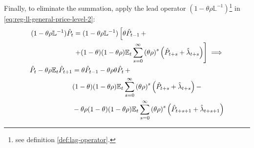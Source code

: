 \documentclass[
	thesis.tex
	]{subfiles}
\begin{document}
Finally, to eliminate the summation, apply the lead operator $(1- \theta \rho \mathbb{L}^{-1})$\footnote{see definition \ref{def:lag-operator}.} in \ref{eq:reg-ll-general-price-level-2}:
\begin{align}
	\begin{split}
		(1- \theta \rho \mathbb{L}^{-1}) \hat{P}_t &= (1- \theta \rho \mathbb{L}^{-1}) \left[ \theta \hat{P}_{t-1} \, + \right. \\
		&\left. + (1-\theta) (1- \theta \rho) {\mathbb{E}_{t}} \sum_{s=0}^{\infty} \left( \theta \rho \right)^s \left( \hat{P}_{t+s} + \hat{\lambda}_{t+s} \right) \right] \implies \nonumber
	\end{split} \\
	\begin{split}
		\hat{P}_t - \theta \rho {\mathbb{E}_{t}} \hat{P}_{t+1} &= \theta \hat{P}_{t-1} - \theta \rho \theta \hat{P}_t \, + \\
		& (1-\theta) (1- \theta \rho) {\mathbb{E}_{t}} \sum_{s=0}^{\infty} \left( \theta \rho \right)^s \left( \hat{P}_{t+s} + \hat{\lambda}_{t+s} \right) - \\
		& - \theta \rho (1-\theta) (1- \theta \rho) {\mathbb{E}_{t}} \sum_{s=0}^{\infty} \left( \theta \rho \right)^s \left( \hat{P}_{t+s+1} + \hat{\lambda}_{t+s+1} \right)
	\end{split} \label{eq:reg-ll-general-price-level-3}
\end{align}
\end{document}
